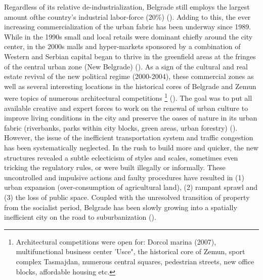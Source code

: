 \documentclass[11pt]{report}
\begin{document}
Regardless of  its relative de-industrialization, Belgrade  still  employs the largest amount ofthe country’s industrial labor-force (20\%)  (\href{Hirt}{\citealt{hirt_belgrade_2009}}).
Adding to this, the ever increasing commercialization of the urban fabric has been underway since 1989. While in the 1990s small and local retails were dominant chiefly around the city center, in the 2000s malls and hyper-markets sponsored by a combination of Western and Serbian capital began to thrive in the greenfield areas at the fringes of the central urban zone (New Belgrade) (\cite{ibid.}).
As a sign of the cultural and real estate revival of the new political regime (2000-2004), these commercial zones as well as several interesting locations in the historical cores of Belgrade and Zemun were topics of numerous architectural competitions 
\footnote{Architectural competitions were open for: Dorcol marina (2007), multifunctional business center 'Usce", the historical core of Zemun, sport complex Tasmajdan, numerous central squares, pedestrian streets, new office blocks, affordable housing etc.} %
(\href{Stupar}{\citealt{stupar_aleksandra_recreating_2004}}).
The goal was to put all available creative and expert forces to work on the renewal of urban culture to improve living conditions in the city and preserve the oases of nature in its urban fabric (riverbanks, parks within city blocks, green areas, urban forestry) (\href{Grozdanic}{\citealt{grozdanic_belgrade_2008}}).
However, the issue of the inefficient transportation system and traffic congestion has been systematically neglected. In the rush to build more and quicker, the new structures revealed a subtle eclecticism of styles and scales, sometimes even tricking the regulatory rules, or were built illegally or informally. These uncontrolled and impulsive actions and faulty procedures have resulted in (1) urban expansion (over-consumption of agricultural land), (2) rampant sprawl and (3) the loss of public space. Coupled with the unresolved transition of property from the socialist period, Belgrade has been slowly growing into a spatially inefficient city on the road to suburbanization (\href{Zekovic}{\citealt{zekovic_spatial_2015}}).
\\
\end{document}
